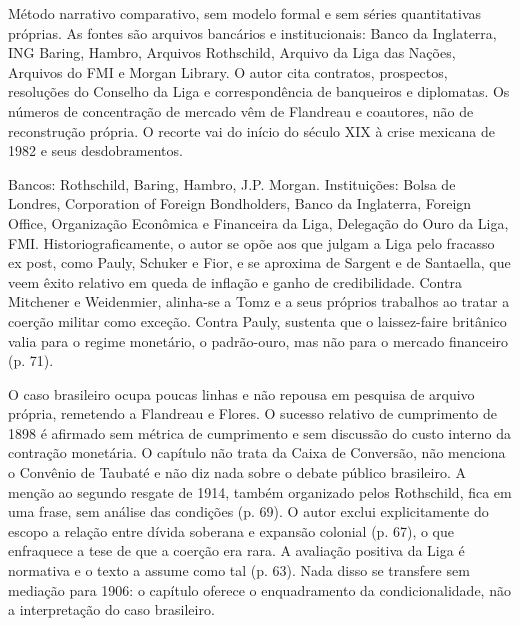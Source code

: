 Método narrativo comparativo, sem modelo formal e sem séries quantitativas
próprias. As fontes são arquivos bancários e institucionais: Banco da
Inglaterra, ING Baring, Hambro, Arquivos Rothschild, Arquivo da Liga das Nações,
Arquivos do FMI e Morgan Library. O autor cita contratos, prospectos, resoluções
do Conselho da Liga e correspondência de banqueiros e diplomatas. Os números de
concentração de mercado vêm de Flandreau e coautores, não de reconstrução
própria. O recorte vai do início do século XIX à crise mexicana de 1982 e seus
desdobramentos.

Bancos: Rothschild, Baring, Hambro, J.P. Morgan. Instituições: Bolsa de Londres,
Corporation of Foreign Bondholders, Banco da Inglaterra, Foreign Office,
Organização Econômica e Financeira da Liga, Delegação do Ouro da Liga, FMI.
Historiograficamente, o autor se opõe aos que julgam a Liga pelo fracasso ex
post, como Pauly, Schuker e Fior, e se aproxima de Sargent e de Santaella, que
veem êxito relativo em queda de inflação e ganho de credibilidade. Contra
Mitchener e Weidenmier, alinha-se a Tomz e a seus próprios trabalhos ao tratar a
coerção militar como exceção. Contra Pauly, sustenta que o laissez-faire
britânico valia para o regime monetário, o padrão-ouro, mas não para o mercado
financeiro (p. 71).

O caso brasileiro ocupa poucas linhas e não repousa em pesquisa de arquivo
própria, remetendo a Flandreau e Flores. O sucesso relativo de cumprimento de
1898 é afirmado sem métrica de cumprimento e sem discussão do custo interno da
contração monetária. O capítulo não trata da Caixa de Conversão, não menciona o
Convênio de Taubaté e não diz nada sobre o debate público brasileiro. A menção
ao segundo resgate de 1914, também organizado pelos Rothschild, fica em uma
frase, sem análise das condições (p. 69). O autor exclui explicitamente do
escopo a relação entre dívida soberana e expansão colonial (p. 67), o que
enfraquece a tese de que a coerção era rara. A avaliação positiva da Liga é
normativa e o texto a assume como tal (p. 63). Nada disso se transfere sem
mediação para 1906: o capítulo oferece o enquadramento da condicionalidade, não
a interpretação do caso brasileiro.

